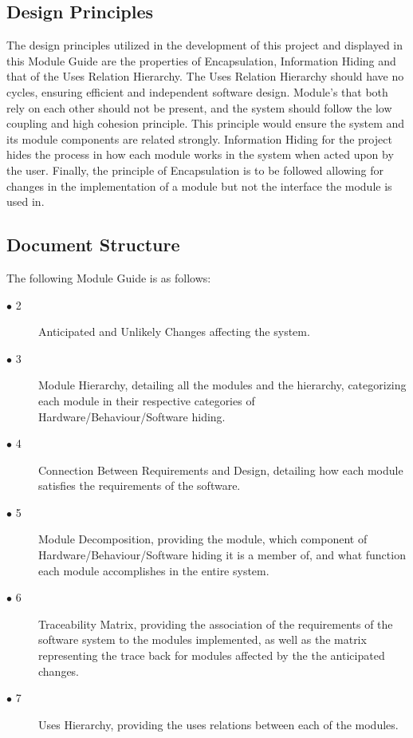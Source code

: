 \documentclass[12pt, titlepage]{article}
\begin{document}
\subsection{Design Principles}
The design principles utilized in the development of this project and displayed in this Module Guide are the properties of Encapsulation, Information Hiding and that of the Uses Relation Hierarchy.
The Uses Relation Hierarchy should have no cycles, ensuring efficient and independent software design. Module's that both rely on each other should not be present, and the system should follow the low coupling and high cohesion principle. This principle would ensure the system and its module components are related strongly. Information Hiding for the project hides the process in how each module works in the system when acted upon by the user. Finally, the principle of Encapsulation is to be followed allowing for changes in the implementation of a module but not the interface the module is used in.
\subsection{Document Structure}
The following Module Guide is as follows:
\begin{description}
\item[$\bullet$ 2]Anticipated and Unlikely Changes affecting the system. 
\item[$\bullet$ 3] Module Hierarchy, detailing all the modules and the hierarchy, categorizing each module in their respective categories of Hardware/Behaviour/Software hiding.
\item[$\bullet$ 4] Connection Between Requirements and Design, detailing how each module satisfies the requirements of the software.
\item[$\bullet$ 5] Module Decomposition, providing the module, which component of Hardware/Behaviour/Software hiding it is a member of, and what function each module accomplishes in the entire system.
\item[$\bullet$ 6] Traceability Matrix, providing the association of the requirements of the software system to the modules implemented, as well as the matrix representing the trace back for modules affected by the the anticipated changes.
\item[$\bullet$ 7] Uses Hierarchy, providing the uses relations between each  of the modules.
\end{description}
\end{document}

